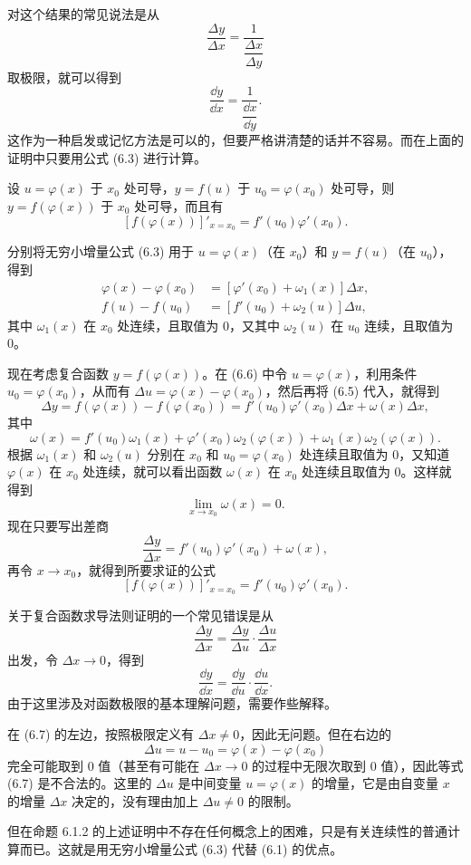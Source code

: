 \begin{xremark}
对这个结果的常见说法是从
\[
  \frac{\Delta y}{\Delta x}=\frac{1}{\dfrac{\Delta x}{\Delta y}}
\]
取极限，就可以得到
\[
  \frac{\dd y}{\dd x}=\frac{1}{\dfrac{\dd x}{\dd y}}.
\]
这作为一种启发或记忆方法是可以的，但要严格讲清楚的话并不容易。而在上面的证明中只要用公式 (6.3) 进行计算。
\end{xremark}

\begin{xproposition}[6.1.2（复合函数求导的链式法则）]
设 $u=\varphi(x)$ 于 $x_0$ 处可导，$y=f(u)$ 于 $u_0=\varphi(x_0)$ 处可导，则 $y=f(\varphi(x))$ 于 $x_0$ 处可导，而且有
\[
  [f(\varphi(x))]'_{x=x_0}=f'(u_0)\varphi'(x_0).
\]
\end{xproposition}
\begin{xproof}
分别将无穷小增量公式 (6.3) 用于 $u=\varphi(x)$（在 $x_0$）和 $y=f(u)$（在 $u_0$），得到
\begin{align}
  \varphi(x)-\varphi(x_0)&=[\varphi'(x_0)+\omega_1(x)]\Delta x, \tag{6.5}\label{eq:6.5}\\
  f(u)-f(u_0)&=[f'(u_0)+\omega_2(u)]\Delta u, \tag{6.6}\label{eq:6.6}
\end{align}
其中 $\omega_1(x)$ 在 $x_0$ 处连续，且取值为 0，又其中 $\omega_2(u)$ 在 $u_0$ 连续，且取值为 0。

现在考虑复合函数 $y=f(\varphi(x))$。在 (6.6) 中令 $u=\varphi(x)$，利用条件 $u_0=\varphi(x_0)$，从而有 $\Delta u=\varphi(x)-\varphi(x_0)$，然后再将 (6.5) 代入，就得到
\[
  \Delta y=f(\varphi(x))-f(\varphi(x_0))
  =f'(u_0)\varphi'(x_0)\Delta x+\omega(x)\Delta x,
\]
其中
\[
  \omega(x)=f'(u_0)\omega_1(x)+\varphi'(x_0)\omega_2(\varphi(x))+\omega_1(x)\omega_2(\varphi(x)).
\]
根据 $\omega_1(x)$ 和 $\omega_2(u)$ 分别在 $x_0$ 和 $u_0=\varphi(x_0)$ 处连续且取值为 0，又知道 $\varphi(x)$ 在 $x_0$ 处连续，就可以看出函数 $\omega(x)$ 在 $x_0$ 处连续且取值为 0。这样就得到
\[
  \lim_{x\to x_0}\omega(x)=0.
\]
现在只要写出差商
\[
  \frac{\Delta y}{\Delta x}=f'(u_0)\varphi'(x_0)+\omega(x),
\]
再令 $x\to x_0$，就得到所要求证的公式
\[
  [f(\varphi(x))]'_{x=x_0}=f'(u_0)\varphi'(x_0).
\]
\end{xproof}

\begin{xremark}
关于复合函数求导法则证明的一个常见错误是从
\begin{equation}
  \frac{\Delta y}{\Delta x}=\frac{\Delta y}{\Delta u}\cdot\frac{\Delta u}{\Delta x}
  \tag{6.7}
  \label{eq:6.7}
\end{equation}
出发，令 $\Delta x\to0$，得到
\[
  \frac{\dd y}{\dd x}=\frac{\dd y}{\dd u}\cdot\frac{\dd u}{\dd x}.
\]
由于这里涉及对函数极限的基本理解问题，需要作些解释。

在 (6.7) 的左边，按照极限定义有 $\Delta x\ne0$，因此无问题。但在右边的
\[
  \Delta u=u-u_0=\varphi(x)-\varphi(x_0)
\]
完全可能取到 0 值（甚至有可能在 $\Delta x\to0$ 的过程中无限次取到 0 值），因此等式 (6.7) 是不合法的。这里的 $\Delta u$ 是中间变量 $u=\varphi(x)$ 的增量，它是由自变量 $x$ 的增量 $\Delta x$ 决定的，没有理由加上 $\Delta u\ne0$ 的限制。

但在命题 6.1.2 的上述证明中不存在任何概念上的困难，只是有关连续性的普通计算而已。这就是用无穷小增量公式 (6.3) 代替 (6.1) 的优点。
\end{xremark}

